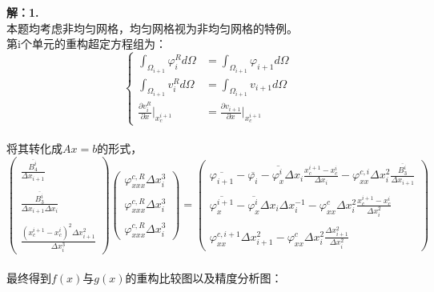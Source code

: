 \documentclass[a4paper,11pt,UTF8]{article}%
\theoremstyle{plain}
\begin{document}
	\noindent \textbf{解：1.}\\
	\indent 本题均考虑非均匀网格，均匀网格视为非均匀网格的特例。\\
	\indent 第i个单元的重构超定方程组为：\\
	$$\left\{
	\begin{aligned}
	\int_{\Omega_{i+1}}\varphi^R_id\Omega&=\int_{\Omega_{i+1}}\varphi_{i+1}d\Omega	\\
	\int_{\Omega_{i+1}}v^R_id\Omega&=\int_{\Omega_{i+1}}v_{i+1}d\Omega\\
	\frac{\partial v^R_i}{\partial x}|_{x^{i+1}_c}&=\frac{\partial v_{i+1}}{\partial x}|_{x^{i+1}_c}		
	\end{aligned}
	\right.$$\\
	将其转化成$Ax=b$的形式，
	\begin{equation*}
	\begin{pmatrix}
		\frac{\overline{B^i_4}}{\Delta x_{i+1}}\\
		~\\
		\frac{\overline{B^i_3}}{\Delta x_{i+1}\Delta x_{i}}\\
		~\\
		\frac{\left(x^{i+1}_c-x^i_c\right)^2\Delta x^2_{i+1}}{\Delta x^3_i}
	\end{pmatrix}
	\begin{pmatrix}
	\varphi^{c,R}_{xxx}\Delta x^3_i\\
	~\\
	\varphi^{c,R}_{xxx}\Delta x^3_i\\
	~\\
	\varphi^{c,R}_{xxx}\Delta x^3_i
\end{pmatrix}=
	\begin{pmatrix}
	\overline{\varphi_{i+1}}-\overline{\varphi_i}-\overline{\varphi^i_x}\Delta x_i \frac{x^{i+1}_c-x^i_c}{\Delta x_i}-\varphi^{c,i}_{xx}\Delta x^2_i \frac{\overline{B^i_3}}{\Delta x_{i+1}}\\
	~\\
	\overline{\varphi^{i+1}_x}-\overline{\varphi^i_x}\Delta x_i \Delta x^{-1}_i-\varphi^c_{xx}\Delta x^2_i \frac{x^{i+1}_c-x^i_c}{\Delta x^2_i}\\
	~\\
	\varphi^{c,i+1}_{xx}\Delta x^2_{i+1}-\varphi^c_{xx}\Delta x^2_i\frac{\Delta x^2_{i+1}}{\Delta x^2_i}
\end{pmatrix}
\end{equation*}	\\
最终得到$f\left(x\right)$与$g\left(x\right)$的重构比较图以及精度分析图：\\
\end{document}

